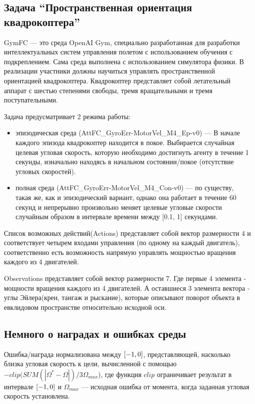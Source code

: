 \subsection*{Задача “Пространственная ориентация квадрокоптера”}

GymFC — это среда OpenAI Gym, специально разработанная для разработки интеллектуальных систем управления полетом с использованием обучения с подкреплением. Сама среда выполнена с использованием симулятора физики. В реализации участники должны научиться управлять пространственной ориентацией квадрокоптера. Квадрокоптер представляет собой летательный аппарат с шестью степенями свободы, тремя вращательными и тремя поступательными. 

Задача предусматривает 2 режима работы: 

\begin{itemize}
    \item эпизодическая среда (AttFC\_GyroErr-MotorVel\_M4\_Ep-v0) — В начале каждого эпизода квадрокоптер находится в покое. Выбирается случайная целевая угловая скорость, которую необходимо достигнуть агенту в течение 1 секунды, изначально находясь в начальном состоянии/покое (отсутствие угловых скоростей).
    \item полная среда (AttFC\_GyroErr-MotorVel\_M4\_Con-v0) — по существу, такая же, как и эпизодический вариант, однако она работает в течение 60 секунд и непрерывно произвольно меняет целевые угловые скорости случайным образом в интервале времени между  [0.1, 1] секундами.
\end{itemize}

Список возможных действий(Actions) представляет собой вектор размерности 4 и соответствует четырем входами управления (по одному на каждый двигатель), соответственно есть возможность напрямую управлять мощностью вращения каждого из 4 двигателей.

Observations представляет собой вектор размерности 7. Где первые 4 элемента - мощности вращения каждого из 4 двигателей. А оставшиеся 3 элемента вектора - углы Эйлера(крен, тангаж и рыскание), которые описывают поворот объекта в евклидовом пространстве относительно исходной оси.


\subsection*{Немного о наградах и ошибках среды}

Ошибка/награда нормализована между $[-1,\space 0]$, представляющей, насколько близка угловая скорость к цели, вычисленной с помощью $-clip (SUM (| \Omega^* - \Omega |) / 3\Omega_{max}$), где функция $clip$ ограничивает результат в интервале $[-1,\space 0]$ и $\Omega_{max}$ — исходная ошибка от момента, когда заданная угловая скорость установлена.


